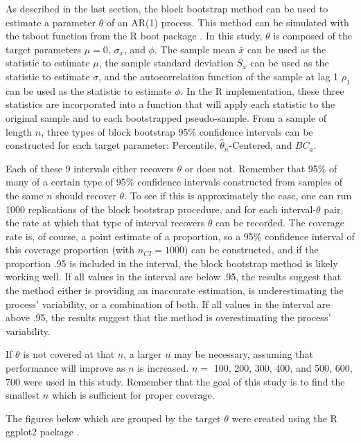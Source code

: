 \documentclass[12pt, letterpaper, titlepage]{article}
\begin{document}
As described in the last section, the block bootstrap method can be used to
estimate a parameter $\theta$ of an AR(1) process. This method can be
simulated with the tsboot function from the R boot package \citep{boot}
\citep{davison1997bootstrap}. In this study, $\theta$ is composed of the target parameters
$\mu = 0$, $\sigma_{x}$, and $\phi$. The sample mean $\bar{x}$ can be used as
the statistic to estimate $\mu$, the sample standard deviation $S_x$ can be
used as the statistic to estimate $\sigma$, and the autocorrelation function
of the sample at lag 1 $\rho_1$ can be used as the statistic to estimate
$\phi$. In the R implementation, these three statistics are incorporated into
a function that will apply each statistic to the original sample and to each
bootstrapped pseudo-sample. From a sample of length $n$, three types of block
bootstrap 95\% confidence intervals can be constructed for each target
parameter:
Percentile, $\hat{\theta}_{n}$-Centered,
and $BC_a$.



Each of these 9 intervals either recovers $\theta$ or does not. Remember that
95\% of many of a certain type of 95\% confidence intervals constructed from
samples of the same $n$ should recover $\theta$. To see if this is
approximately the case, one can run 1000 replications of the block bootstrap
procedure, and for each interval-$\theta$ pair, the rate at which that type of
interval recovers $\theta$ can be recorded. The coverage rate is, of course, a
point estimate of a proportion, so a 95\% confidence interval of this coverage
proportion (with $n_{CI} = 1000$) can be constructed, and if the proportion
.95 is included in the interval, the block bootstrap method is likely working
well. If all values in the interval are below .95, the results suggest that the
method either is providing an inaccurate estimation, is underestimating the
process' variability, or a combination of both. If all values in the interval
are above .95, the results suggest that the method is overestimating the
process' variability.


If $\theta$ is not covered at that $n$, a larger $n$ may be
necessary, assuming that performance will improve as $n$ is increased. $n =$
100, 200, 300, 400, and 500, 600, 700 were used in this study. Remember that
the goal of this study is to find the smallest $n$ which is sufficient for
proper coverage. 


The figures below which are grouped by the target $\theta$  were created using
the R ggplot2 package \citep{ggplot2}.
\end{document}

